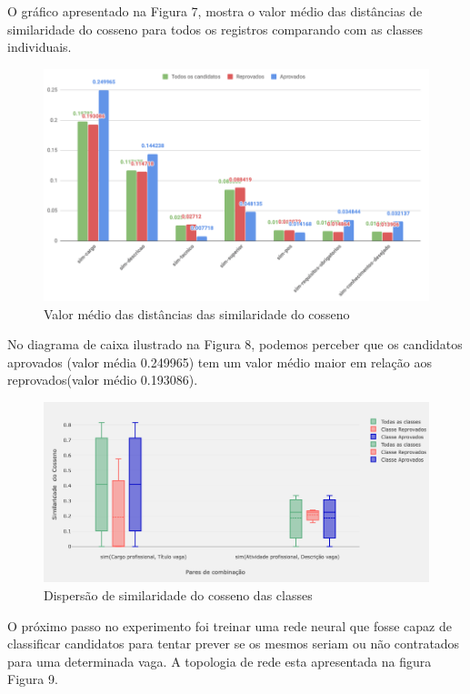 \documentclass[conference]{IEEEtran}
\begin{document}
O gráfico apresentado na Figura 7, mostra o valor médio das distâncias  de similaridade do cosseno para todos os registros comparando com as classes individuais.
      \begin{figure}
    \centering
    \includegraphics[scale=0.5]{imagens/barras.png}
    \caption{Valor médio das distâncias das similaridade do cosseno}
    \label{barras}
  	\end{figure} 

 No diagrama de caixa ilustrado na Figura 8, podemos perceber que os candidatos aprovados (valor média 0.249965) tem um valor médio maior em relação aos reprovados(valor médio 0.193086). 
  \begin{figure}
    \centering
    \includegraphics[scale=0.5]{imagens/grafico_dispersao.png}
    \caption{Dispersão de similaridade do cosseno das classes}
    \label{dispersao}
  \end{figure} 

O próximo passo no experimento foi treinar uma rede neural que fosse capaz de classificar candidatos para tentar prever se os mesmos seriam ou não contratados para uma determinada vaga.
    A topologia de rede esta apresentada na figura Figura 9.
    
\end{document}
